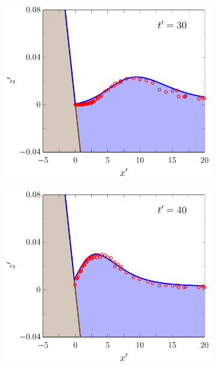 \documentclass[times]{elsarticle}
\begin{document}
\begin{figure}
	\centering
	\begin{subfigure}{0.5\textwidth}
		\includegraphics[width=\textwidth]{./Figures/Experimental/Synolakis/nonbreaking/30s.pdf}
		\vspace{0.5cm}
	\end{subfigure}%
	\begin{subfigure}{0.5\textwidth}
		\includegraphics[width=\textwidth]{./Figures/Experimental/Synolakis/nonbreaking/40s.pdf}
		\vspace{0.5cm}

\end{subfigure}
\end{figure}
\end{document}
